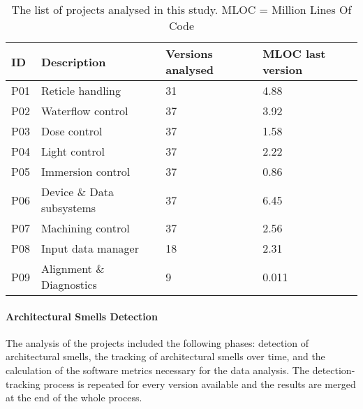 \begin{table}[tbp]
    \footnotesize
    \centering
    \caption{The list of projects analysed in this study. MLOC = Million Lines Of Code}
    \label{c4:tab:projects}
    \begin{tabular}{@{}llll@{}}
    \toprule
    \textbf{ID} & \textbf{Description} & \textbf{Versions analysed} & \textbf{MLOC last version} \\ \midrule
    P01  & Reticle handling     & 31        & 4.88         \\ %
    P02  & Waterflow control    & 37        & 3.92         \\ %
    P03  & Dose control         & 37        & 1.58         \\ %
    P04  & Light control        & 37        & 2.22         \\ %
    P05  & Immersion control    & 37        & 0.86         \\ %
    P06  & Device \& Data subsystems & 37    & 6.45         \\ %
    P07  & Machining control    & 37        & 2.56         \\ %
    P08  & Input data manager   & 18        & 2.31         \\ %
    P09  & Alignment \& Diagnostics & 9     & 0.011      \\ %
    \bottomrule
    \end{tabular}
\end{table}

\paragraph{Architectural Smells Detection}
The analysis of the projects included the following phases: detection of architectural smells, the tracking of architectural smells over time, and the calculation of the software metrics necessary for the data analysis. 
The detection-tracking process is repeated for every version available and the results are merged at the end of the whole process.

